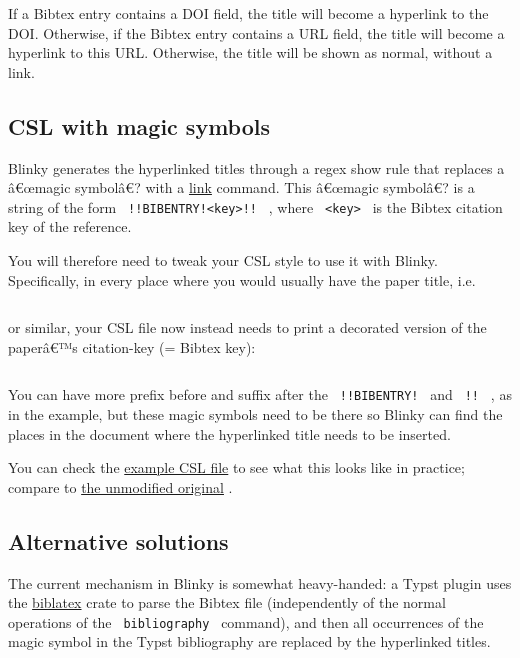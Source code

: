 If a Bibtex entry contains a DOI field, the title will become a
hyperlink to the DOI. Otherwise, if the Bibtex entry contains a URL
field, the title will become a hyperlink to this URL. Otherwise, the
title will be shown as normal, without a link.

\subsection{CSL with magic symbols}\label{csl-with-magic-symbols}

Blinky generates the hyperlinked titles through a regex show rule that
replaces a â€œmagic symbolâ€? with a
\href{https://typst.app/docs/reference/model/link/}{link} command. This
â€œmagic symbolâ€? is a string of the form
\texttt{\ !!BIBENTRY!\textless{}key\textgreater{}!!\ } , where
\texttt{\ \textless{}key\textgreater{}\ } is the Bibtex citation key of
the reference.

You will therefore need to tweak your CSL style to use it with Blinky.
Specifically, in every place where you would usually have the paper
title, i.e.

\begin{verbatim}
\end{verbatim}

or similar, your CSL file now instead needs to print a decorated version
of the paperâ€™s citation-key (= Bibtex key):

\begin{verbatim}
\end{verbatim}

You can have more prefix before and suffix after the
\texttt{\ !!BIBENTRY!\ } and \texttt{\ !!\ } , as in the example, but
these magic symbols need to be there so Blinky can find the places in
the document where the hyperlinked title needs to be inserted.

You can check the
\href{https://github.com/alexanderkoller/typst-blinky/blob/main/examples/association-for-computational-linguistics-blinky.csl}{example
CSL file} to see what this looks like in practice; compare to
\href{https://github.com/citation-style-language/styles/blob/master/association-for-computational-linguistics.csl}{the
unmodified original} .

\subsection{Alternative solutions}\label{alternative-solutions}

The current mechanism in Blinky is somewhat heavy-handed: a Typst plugin
uses the \href{https://github.com/typst/biblatex}{biblatex} crate to
parse the Bibtex file (independently of the normal operations of the
\texttt{\ bibliography\ } command), and then all occurrences of the
magic symbol in the Typst bibliography are replaced by the hyperlinked
titles.

